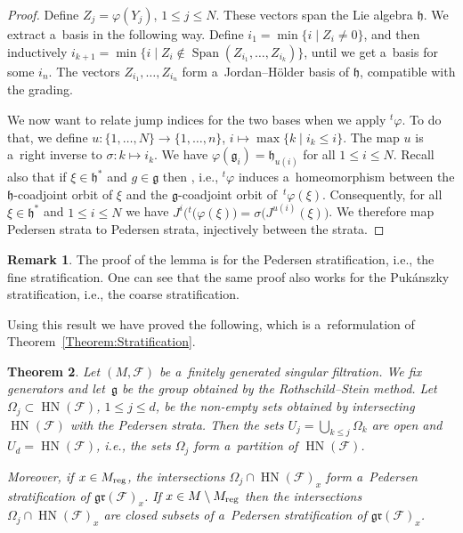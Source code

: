 \documentclass[pdftex]{sigma}
\newcommand{\tsp}[1]{{}^t \! #1} %
\newcommand{\Span}{\operatorname{Span}} %
\newcommand{\F}{\mathcal{F}} %
\newcommand{\Ad}{\operatorname{Ad}} %
\newcommand{\g}{\mathfrak{g}} %
\newcommand{\HN}{\operatorname{HN}} %
\newcommand{\Fb}{\mathcal{F}} %
\newcommand{\gr}{\mathfrak{gr}} %
\numberwithin{equation}{section}
\newtheorem{thm}{Theorem}[section]
\theoremstyle{definition}
\newtheorem{rem}[thm]{Remark}
\begin{document}
\begin{proof}
 Define $Z_j = \varphi(Y_j)$, $1\leq j \leq N$. These vectors span the Lie algebra $\mathfrak{h}$. We extract a~basis in the following way. Define $i_1 = \min\{i\mid Z_i \neq 0\}$,
 and then inductively $i_{k+1} = \min\{i \mid Z_i \notin \Span(Z_{i_1},\dots, Z_{i_k})\}$,
 until we get a~basis for some $i_n$.
 The vectors $Z_{i_1}, \dots, Z_{i_n}$ form a~Jordan--H\"older basis of $\mathfrak{h}$, compatible with the grading.

 We now want to relate jump indices for the two bases when we apply $\tsp\varphi$. To do that, we define
$u \colon  \{1,\dots,N\}  \to \{1,\dots,n\}$, $ i \mapsto \max\{k\mid i_k \leq i\}$.
 The map $u$ is a~right inverse to $\sigma \colon k \mapsto i_k$. We have $\varphi(\g_i) = \mathfrak{h}_{u(i)}$ for all $1\leq i \leq N$. Recall also that if $\xi \in \mathfrak{h}^*$ and $g \in \g$ then \smash{$\tsp\varphi\bigl(\Ad^*_{\varphi(g)}(\xi)\bigr) = \Ad^*_g\bigl(\tsp\varphi(\xi)\bigr)$},
 i.e., $\tsp\varphi$ induces a~homeomorphism between the $\mathfrak{h}$-coadjoint orbit of $\xi$ and the $\g$-coadjoint orbit of~$\tsp\varphi(\xi)$.
 Consequently, for all $\xi \in \mathfrak{h}^*$ and $1\leq i \leq N$ we have $J^i\bigl(\tsp(\varphi(\xi)\bigr) = \sigma\bigl(J^{u(i)}(\xi)\bigr)$.
 We therefore map Pedersen strata to Pedersen strata, injectively between the strata.
\end{proof}

\begin{rem}
 The proof of the lemma is for the Pedersen stratification, i.e., the fine stratification. One can see that the same proof also works for the Puk\'anszky stratification, i.e., the coarse stratification.
\end{rem}

Using this result we have proved the following, which is a~reformulation of Theorem~\ref{Theorem:Stratification}.

\begin{thm}\label{Theorem:Stratification-InText}
 Let $(M,\Fb)$ be a~finitely generated singular filtration. We fix generators and let~$\g$ be the group obtained by the Rothschild--Stein method.
 Let $\Omega_j \subset \HN(\Fb)$, $1\leq j \leq d$, be the non-empty sets obtained by intersecting $\HN(\Fb)$ with the Pedersen strata. Then the sets $U_j=\bigcup_{k\leq j}\Omega_k$ are open and $U_d = \HN(\Fb)$, i.e., the sets $\Omega_j$ form a~partition of $\HN(\Fb)$.

 Moreover, if $x \in M_{\rm reg}$, the intersections $\Omega_j\cap \HN(\F)_x$ form a~Pedersen stratification of $\gr(\Fb)_x$. If $x\in M\setminus M_{\rm reg}$ then the intersections $\Omega_j\cap \HN(\F)_x$ are closed subsets of a~Pedersen stratification of $\gr(\Fb)_x$.
\end{thm}
\end{document}
